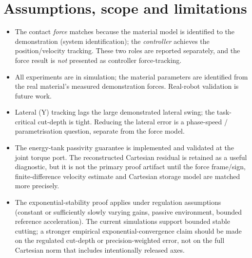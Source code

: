 \documentclass[11pt,a4paper]{article}
\begin{document}
\section{Assumptions, scope and limitations}
\begin{itemize}[leftmargin=1.5em]
\item The contact \emph{force} matches because the material model is identified to
the demonstration (system identification); the \emph{controller} achieves the
position/velocity tracking. These two roles are reported separately, and the force
result is \emph{not} presented as controller force-tracking.
\item All experiments are in simulation; the material parameters are identified
from the real material's measured demonstration forces. Real-robot validation is
future work.
\item Lateral (Y) tracking lags the large demonstrated lateral swing; the
task-critical cut-depth is tight. Reducing the lateral error is a
phase-speed / parametrisation question, separate from the force model.
\item The energy-tank passivity guarantee is implemented and validated at the
joint torque port. The reconstructed Cartesian residual is retained as a useful
diagnostic, but it is not the primary proof artifact until the force frame/sign,
finite-difference velocity estimate and Cartesian storage model are matched more
precisely.
\item The exponential-stability proof applies under regulation assumptions
(constant or sufficiently slowly varying gains, passive environment, bounded
reference acceleration). The current simulations support bounded stable cutting;
a stronger empirical exponential-convergence claim should be made on the
regulated cut-depth or precision-weighted error, not on the full Cartesian norm
that includes intentionally released axes.
\end{itemize}
\end{document}
